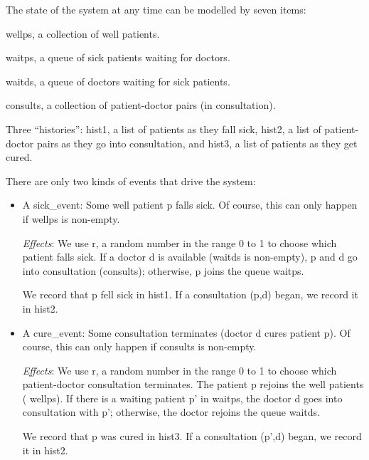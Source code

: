 The state of the system at any time can be modelled by seven items:
\begin{tightlist}

\item {\cf wellps}, a collection of well patients.

\item {\cf waitps}, a queue of sick patients waiting for doctors.

\item {\cf waitds}, a queue of doctors waiting for sick patients.

\item {\cf consults}, a collection of patient-doctor pairs (in consultation).

\item Three ``histories'': {\cf hist1}, a list of patients as they fall
sick, {\cf hist2}, a list of patient-doctor pairs as they go into
consultation, and {\cf hist3}, a list of patients as they get cured.

\end{tightlist}

There are only two kinds of events that drive the system:

\begin{itemize}

\item A {\cf sick\_event}: Some well patient {\cf p} falls sick.  Of course,
this can only happen if {\cf wellps} is non-empty.

{\em Effects\/}: We use {\cf r}, a random number in the range 0 to 1
to choose which patient falls sick.  If a doctor {\cf d} is available
({\cf waitds} is non-empty), {\cf p} and {\cf d} go into consultation
({\cf consults}); otherwise, {\cf p} joins the queue {\cf waitps}.

We record that {\cf p} fell sick in {\cf hist1}.  If a consultation
{\cf (p,d)} began, we record it in {\cf hist2}.

\item A {\cf cure\_event}:  Some consultation terminates (doctor {\cf d} cures patient {\cf p}).
Of course, this can only happen if {\cf consults} is non-empty.

{\em Effects\/}: We use {\cf r}, a random number in the
range 0 to 1 to choose which patient-doctor consultation terminates.
The patient {\cf p} rejoins the well patients ({\cf
wellps}).  If there is a waiting patient {\cf p'} in {\cf waitps}, the
doctor {\cf d} goes into consultation with {\cf p'}; otherwise, the
doctor rejoins the queue {\cf waitds}.

We record that {\cf p} was cured in {\cf hist3}.  If a consultation
{\cf (p',d)} began, we record it in {\cf hist2}.

\end{itemize}


